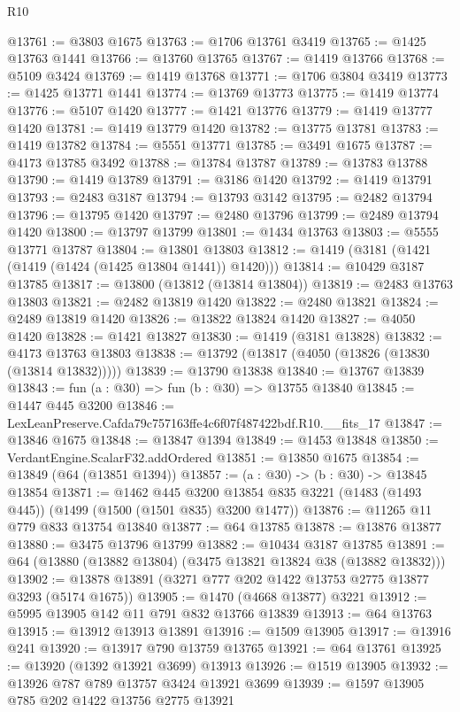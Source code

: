 \begin{lexlean}{R10}
\begin{coremodule}
@13761 := @3803 @1675
@13763 := @1706 @13761 @3419
@13765 := @1425 @13763 @1441
@13766 := @13760 @13765
@13767 := @1419 @13766
@13768 := @5109 @3424
@13769 := @1419 @13768
@13771 := @1706 @3804 @3419
@13773 := @1425 @13771 @1441
@13774 := @13769 @13773
@13775 := @1419 @13774
@13776 := @5107 @1420
@13777 := @1421 @13776
@13779 := @1419 @13777 @1420
@13781 := @1419 @13779 @1420
@13782 := @13775 @13781
@13783 := @1419 @13782
@13784 := @5551 @13771
@13785 := @3491 @1675
@13787 := @4173 @13785 @3492
@13788 := @13784 @13787
@13789 := @13783 @13788
@13790 := @1419 @13789
@13791 := @3186 @1420
@13792 := @1419 @13791
@13793 := @2483 @3187
@13794 := @13793 @3142
@13795 := @2482 @13794
@13796 := @13795 @1420
@13797 := @2480 @13796
@13799 := @2489 @13794 @1420
@13800 := @13797 @13799
@13801 := @1434 @13763
@13803 := @5555 @13771 @13787
@13804 := @13801 @13803
@13812 := @1419 (@3181 (@1421 (@1419 (@1424 (@1425 @13804 @1441)) @1420)))
@13814 := @10429 @3187 @13785
@13817 := @13800 (@13812 (@13814 @13804))
@13819 := @2483 @13763 @13803
@13821 := @2482 @13819 @1420
@13822 := @2480 @13821
@13824 := @2489 @13819 @1420
@13826 := @13822 @13824 @1420
@13827 := @4050 @1420
@13828 := @1421 @13827
@13830 := @1419 (@3181 @13828)
@13832 := @4173 @13763 @13803
@13838 := @13792 (@13817 (@4050 (@13826 (@13830 (@13814 @13832)))))
@13839 := @13790 @13838
@13840 := @13767 @13839
@13843 := fun (a : @30) => fun (b : @30) => @13755 @13840
@13845 := @1447 @445 @3200
@13846 := LexLeanPreserve.Cafda79c757163ffe4c6f07f487422bdf.R10.__fits_17
@13847 := @13846 @1675
@13848 := @13847 @1394
@13849 := @1453 @13848
@13850 := VerdantEngine.ScalarF32.addOrdered
@13851 := @13850 @1675
@13854 := @13849 (@64 (@13851 @1394))
@13857 := (a : @30) -> (b : @30) -> @13845 @13854
@13871 := @1462
    @445
    @3200
    @13854
    @835
    @3221
    (@1483 (@1493 @445))
    (@1499 (@1500 (@1501 @835) @3200 @1477))
@13876 := @11265 @11 @779 @833 @13754 @13840
@13877 := @64 @13785
@13878 := @13876 @13877
@13880 := @3475 @13796 @13799
@13882 := @10434 @3187 @13785
@13891 := @64 (@13880 (@13882 @13804) (@3475 @13821 @13824 @38 (@13882 @13832)))
@13902 := @13878 @13891 (@3271 @777 @202 @1422 @13753 @2775 @13877 @3293 (@5174 @1675))
@13905 := @1470 (@4668 @13877) @3221
@13912 := @5995 @13905 @142 @11 @791 @832 @13766 @13839
@13913 := @64 @13763
@13915 := @13912 @13913 @13891
@13916 := @1509 @13905
@13917 := @13916 @241
@13920 := @13917 @790 @13759 @13765
@13921 := @64 @13761
@13925 := @13920 (@1392 @13921 @3699) @13913
@13926 := @1519 @13905
@13932 := @13926 @787 @789 @13757 @3424 @13921 @3699
@13939 := @1597 @13905 @785 @202 @1422 @13756 @2775 @13921

\end{coremodule}
\end{lexlean}
